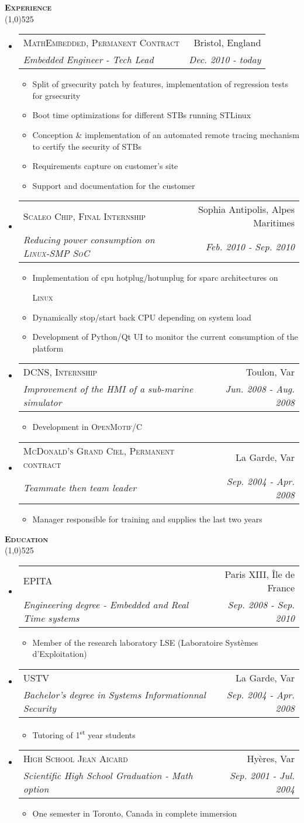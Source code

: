 \documentclass[letterpaper,11pt]{article}
\makeatletter
\newcommand{\resitem}[1]{\item #1}
\newcommand{\titlecolor}[0]{RoyalBlue4}
\newcommand{\bulletcolor}[0]{darkgray}
\newcommand{\resheading}[1]{
  \vspace{10pt}
  {\Large
        \textsc{\textcolor{\titlecolor}{\textbf{#1}}}
  } \\
  \vspace{-10.5pt}
  \hspace{-1pt}\textcolor{\titlecolor}{\line(1,0){525}}
}
\newcommand{\ressubheading}[4]{
  \vspace{8pt}
  \begin{tabular*}{7.0in}{l@{\extracolsep{\fill}}r}
    \textsc{#1} & #2 \\
    \textsl{#3} & \textit{#4} \\
  \end{tabular*}
}
\newcommand{\prettylist}[0]{
  \begin{itemize}
    \renewcommand{\labelitemi}{{\tiny \textcolor{\bulletcolor}{$\bullet$}}}
    \renewcommand{\labelitemiii}{$\cdot$}
}
\newcommand{\acro}[1]{
  {\small\textsc{#1}}\hspace{-3pt}
}
\makeatother
\begin{document}
\resheading{Experience}
\prettylist
\item
  \ressubheading{MathEmbedded, Permanent Contract}{Bristol, England}{Embedded Engineer - Tech Lead}{Dec. 2010 - today}
  \begin{itemize}
    \resitem{Split of grsecurity patch by features, implementation of regression tests for grsecurity}
    \resitem{Boot time optimizations for different STBs running STLinux}
    \resitem{Conception \& implementation of an automated remote tracing mechanism to certify the security of STBs}
    \resitem{Requirements capture on customer's site}
    \resitem{Support and documentation for the customer}
  \end{itemize}
\item
  \ressubheading{Scaleo Chip, Final Internship}{Sophia Antipolis, Alpes Maritimes}{Reducing power consumption on \acro{Linux-SMP SoC}}{Feb. 2010 - Sep. 2010}
  \begin{itemize}
    \resitem{Implementation of cpu hotplug/hotunplug for sparc architectures on
      \acro{Linux}} 
      \resitem{Dynamically stop/start back CPU depending on system load}
    \resitem{Development of Python/Qt UI to monitor the current consumption
      of the platform}
  \end{itemize}
\item
  \ressubheading{DCNS, Internship}{Toulon, Var}{Improvement of the HMI of a sub-marine simulator}{Jun. 2008 - Aug. 2008}
  \begin{itemize}
    \resitem Development in\acro{OpenMotif/C}
  \end{itemize}
\item
  \ressubheading{McDonald's Grand Ciel, Permanent contract}{La Garde,
    Var}{Teammate then team leader}{Sep. 2004 - Apr. 2008}
  \begin{itemize}
    \resitem Manager responsible for training and supplies the last two years
  \end{itemize}
\end{itemize}

\resheading{Education}
\prettylist
\item
  \ressubheading{EPITA}{Paris XIII, Île de France}{Engineering degree -
    Embedded and Real Time systems}{Sep. 2008 - Sep. 2010}
  \begin{itemize}
    \resitem{Member of the research laboratory LSE (Laboratoire Systèmes
      d'Exploitation)}
  \end{itemize}
\item
  \ressubheading{USTV}{La Garde, Var}{Bachelor's degree in Systems
    Informationnal Security}{Sep. 2004 - Apr. 2008}
  \begin{itemize}
    \resitem{Tutoring of 1\textsuperscript{st} year students}
  \end{itemize}
\item
  \ressubheading{High School Jean Aicard}{Hyères, Var}{Scientific High School
    Graduation - Math option}{Sep. 2001 - Jul. 2004}
  \begin{itemize}
    \resitem{One semester in Toronto, Canada in complete immersion}
  \end{itemize}
\end{itemize}
\end{document}
